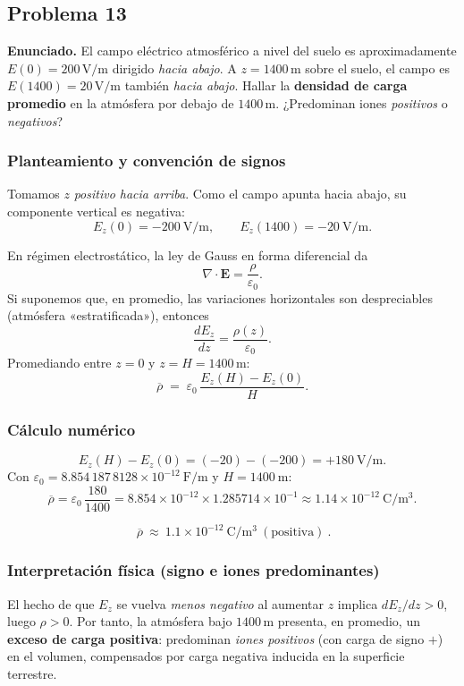 \documentclass{article}
\begin{document}
\subsection{Problema 13} \vspace{0.5cm}

\textbf{Enunciado.} El campo eléctrico atmosférico a nivel del suelo es aproximadamente $E(0)=200\,\mathrm{V/m}$ dirigido \emph{hacia abajo}. A $z=1400\,\mathrm{m}$ sobre el suelo, el campo es $E(1400)=20\,\mathrm{V/m}$ también \emph{hacia abajo}. Hallar la \textbf{densidad de carga promedio} en la atmósfera por debajo de $1400\,\mathrm{m}$. ¿Predominan iones \emph{positivos} o \emph{negativos}?

\subsubsection*{Planteamiento y convención de signos}
Tomamos $z$ \emph{positivo hacia arriba}. Como el campo apunta hacia abajo, su componente vertical es negativa:
\[
E_z(0)=-200\ \mathrm{V/m},\qquad E_z(1400)=-20\ \mathrm{V/m}.
\]

En régimen electrostático, la ley de Gauss en forma diferencial da
\[
\nabla\!\cdot\!\mathbf E=\frac{\rho}{\varepsilon_0}.
\]
Si suponemos que, en promedio, las variaciones horizontales son despreciables (atmósfera «estratificada»), entonces
\[
\frac{dE_z}{dz}=\frac{\rho(z)}{\varepsilon_0}.
\]
Promediando entre $z=0$ y $z=H=1400\,\mathrm{m}$:
\[
\overline{\rho}\;=\;\varepsilon_0\,\frac{E_z(H)-E_z(0)}{H}.
\]

\subsubsection*{Cálculo numérico}
\[
E_z(H)-E_z(0)=(-20)-(-200)=+180\ \mathrm{V/m}.
\]
Con $\varepsilon_0=8.854\,187\,8128\times10^{-12}\ \mathrm{F/m}$ y $H=1400\ \mathrm{m}$:
\[
\overline{\rho}
=\varepsilon_0\,\frac{180}{1400}
=8.854\times10^{-12}\times 1.285714\times10^{-1}
\approx 1.14\times 10^{-12}\ \mathrm{C/m^3}.
\]

\[
\boxed{\ \overline{\rho}\ \approx\ 1.1\times 10^{-12}\ \mathrm{C/m^3}\ (\text{positiva})\ }.
\]

\subsubsection*{Interpretación física (signo e iones predominantes)}
El hecho de que $E_z$ se vuelva \emph{menos negativo} al aumentar $z$ implica $dE_z/dz>0$, luego $\rho>0$. Por tanto, la atmósfera bajo $1400\,\mathrm{m}$ presenta, en promedio, un \textbf{exceso de carga positiva}: predominan \emph{iones positivos} (con carga de signo $+$) en el volumen, compensados por carga negativa inducida en la superficie terrestre.
\end{document}
